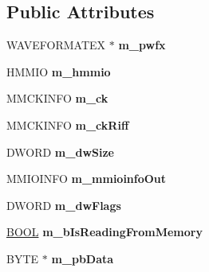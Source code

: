 \subsection*{Public Attributes}
\begin{DoxyCompactItemize}
\item 
\hypertarget{class_c_wave_file_af6ddc54fd08fab871fb6dea739bde255}{W\+A\+V\+E\+F\+O\+R\+M\+A\+T\+E\+X $\ast$ {\bfseries m\+\_\+pwfx}}\label{class_c_wave_file_af6ddc54fd08fab871fb6dea739bde255}

\item 
\hypertarget{class_c_wave_file_aec1872e4a8671bf4ba1df0a5d730cfc9}{H\+M\+M\+I\+O {\bfseries m\+\_\+hmmio}}\label{class_c_wave_file_aec1872e4a8671bf4ba1df0a5d730cfc9}

\item 
\hypertarget{class_c_wave_file_aab9779a9fa7ba2d7da6a0212b1f2c33a}{M\+M\+C\+K\+I\+N\+F\+O {\bfseries m\+\_\+ck}}\label{class_c_wave_file_aab9779a9fa7ba2d7da6a0212b1f2c33a}

\item 
\hypertarget{class_c_wave_file_aa18dcef80431faa12e36900136117e79}{M\+M\+C\+K\+I\+N\+F\+O {\bfseries m\+\_\+ck\+Riff}}\label{class_c_wave_file_aa18dcef80431faa12e36900136117e79}

\item 
\hypertarget{class_c_wave_file_a1d9d2e7e77831165fcacebba1546fe32}{D\+W\+O\+R\+D {\bfseries m\+\_\+dw\+Size}}\label{class_c_wave_file_a1d9d2e7e77831165fcacebba1546fe32}

\item 
\hypertarget{class_c_wave_file_ae248583fb5f147af50447efdac04f308}{M\+M\+I\+O\+I\+N\+F\+O {\bfseries m\+\_\+mmioinfo\+Out}}\label{class_c_wave_file_ae248583fb5f147af50447efdac04f308}

\item 
\hypertarget{class_c_wave_file_a0d7fac94c4d49660080f9f77ad2606d2}{D\+W\+O\+R\+D {\bfseries m\+\_\+dw\+Flags}}\label{class_c_wave_file_a0d7fac94c4d49660080f9f77ad2606d2}

\item 
\hypertarget{class_c_wave_file_a0cffb36318ba8d1fa7998fbaad3369ea}{\hyperlink{_ice_types_8h_a050c65e107f0c828f856a231f4b4e788}{B\+O\+O\+L} {\bfseries m\+\_\+b\+Is\+Reading\+From\+Memory}}\label{class_c_wave_file_a0cffb36318ba8d1fa7998fbaad3369ea}

\item 
\hypertarget{class_c_wave_file_af904f348df995e199a3f2c829732382e}{B\+Y\+T\+E $\ast$ {\bfseries m\+\_\+pb\+Data}}\label{class_c_wave_file_af904f348df995e199a3f2c829732382e}


\end{DoxyCompactItemize}
